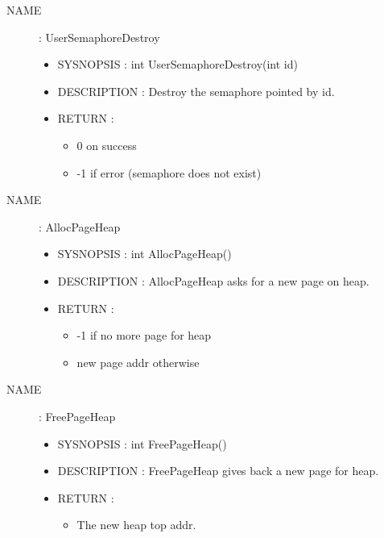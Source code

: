 \documentclass[a4paper,10pt]{article}
\begin{document}
\begin{description}
    \item [NAME] : UserSemaphoreDestroy
        \begin{itemize}
            \item SYSNOPSIS : int UserSemaphoreDestroy(int id)
            \item DESCRIPTION :
                Destroy the semaphore pointed by id.
            \item RETURN :
                \begin{itemize}
                    \item 0 on success
                    \item -1 if error (semaphore does not exist)
                \end{itemize}
        \end{itemize}

    \item [NAME] : AllocPageHeap
        \begin{itemize}
            \item SYSNOPSIS : int AllocPageHeap()
            \item DESCRIPTION :
                AllocPageHeap asks for a new page on heap.
            \item RETURN :
                \begin{itemize}
                    \item -1 if no more page for heap
                    \item new page addr otherwise
                \end{itemize}
        \end{itemize}

    \item [NAME] : FreePageHeap
        \begin{itemize}
            \item SYSNOPSIS : int FreePageHeap()
            \item DESCRIPTION :
                FreePageHeap gives back a new page for heap.
            \item RETURN :
                \begin{itemize}
                    \item The new heap top addr.
                \end{itemize}
        \end{itemize}


\end{description}
\end{document}
